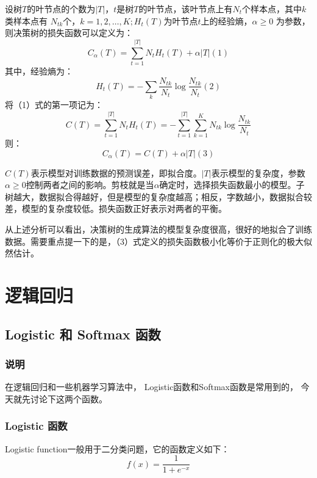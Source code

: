 \documentclass[a4paper,12pt]{book}
\begin{document}
    设树$T$的叶节点的个数为$|T|$，$t$是树$T$的叶节点，该叶节点上有$N_t$个样本点，其中$k$类样本点有
    $N_{tk}$个，$k=1,2,\dots,K;H_t(T)$为叶节点$t$上的经验熵，$\alpha \ge 0$ 为参数，则决策树的损失函数可以定义为：
    $$C_{\alpha}(T)=\sum_{t=1}^{|T|}N_tH_t(T)+\alpha|T| (1)$$
    其中，经验熵为：
    $$H_t(T)=-\sum_k\frac{N_{tk}}{N_t} \log \frac{N_{tk}}{N_t}(2)$$
    将（1）式的第一项记为：
    $$C(T) = \sum_{t=1}^{|T|}N_tH_t(T) = -\sum_{t=1}^{|T|}\sum_{k=1}^KN_{tk} \log \frac{N_{tk}}{N_t}$$
    则：
    $$C_{\alpha}(T)=C(T)+\alpha|T| (3)$$

    $C(T)$表示模型对训练数据的预测误差，即拟合度。$|T|$表示模型的复杂度，参数$\alpha \ge 0$控制两者之间的影响。剪枝就是当$\alpha$确定时，选择损失函数最小的模型。子树越大，数据拟合得越好，但是模型的复杂度越高；相反，字数越小，数据拟合较差，模型的复杂度较低。损失函数正好表示对两者的平衡。

    从上述分析可以看出，决策树的生成算法的模型复杂度很高，很好的地拟合了训练数据。需要重点提一下的是，（3）式定义的损失函数极小化等价于正则化的极大似然估计。
    
    
    \chapter{逻辑回归}
    \section{Logistic 和 Softmax 函数}
    \subsection{说明}
    在逻辑回归和一些机器学习算法中， Logistic函数和Softmax函数是常用到的，
    今天就先讨论下这两个函数。
    \subsection{Logistic 函数}
    Logistic function一般用于二分类问题，它的函数定义如下：
    \begin{equation}
        f(x) = \frac{1}{1+e^{-x}}
    \end{equation}
    
\end{document}
